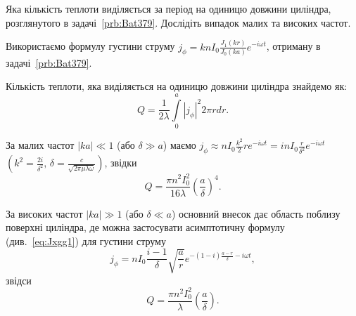 \begin{problem}%
Яка кількість теплоти виділяється за період на одиницю довжини циліндра, розглянутого в задачі~\ref{prb:Bat379}. Дослідіть  випадок малих та високих частот.
\begin{solution}
	Використаємо формулу густини струму $j_{\phi} = knI_0\frac{J_1(kr)}{J_0(ka)}e^{-i\omega t}$, отриману в задачі~\ref{prb:Bat379}.

	Кількість теплоти, яка виділяється на одиницю довжини циліндра знайдемо як:
	\[
		Q = \frac{1}{2\lambda}\int\limits_0^a |j_{\phi}|^2 2\pi rdr.
	\]

	За малих частот $|ka| \ll 1$ (або $\delta \gg a$) маємо $j_{\phi} \approx nI_0\frac{k^2}{2}re^{-i\omega t} = inI_0\frac{r}{\delta^2}e^{-i\omega t}$ $\left( k^2 = \frac{2i}{\delta^2},\,  \delta = \frac{c}{\sqrt{2\pi\mu\lambda\omega}}\right) $, звідки
	\[
		Q = \frac{\pi n^2 I_0^2}{16\lambda}\left( \frac{a}{\delta}\right)^4.
	\]

	За високих частот $|ka| \gg 1$ (або $\delta \ll a$) основний внесок дає область поблизу поверхні циліндра, де можна застосувати асимптотичну формулу (див.~\eqref{eq:Jxgg1}) для густини струму
	\[
		j_{\phi} = nI_0\frac{i - 1}{\delta}\sqrt{\frac{a}{r}}e^{-(1-i)\frac{a-r}{\delta} - i\omega t},
	\]
	звідси
	\[
		Q = \frac{\pi n^2I_0^2}{\lambda}\left( \frac{a}{\delta}\right).
	\]
\end{solution}
\end{problem}


